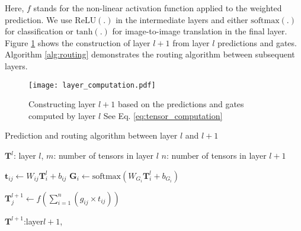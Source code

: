 \documentclass[10pt,twocolumn,letterpaper]{article}
\newlength\myindent
\newcommand\bindent{\begingroup
	\setlength{\itemindent}{\myindent}
	\addtolength{\algorithmicindent}{\myindent}
}
\newcommand\eindent{\endgroup}
\begin{document}
Here, $f$ stands for the non-linear activation function applied to the weighted prediction. We use $\mathrm{ReLU}(.)$ in the intermediate layers and either $\mathrm{softmax}(.)$ for classification or $\mathrm{tanh}(.)$ for image-to-image translation in the final layer. Figure \ref{fig:routing} shows the construction of layer $l+1$ from layer $l$ predictions and gates.
Algorithm \ref{alg:routing} demonstrates the routing algorithm between subsequent layers.



\begin{figure}[t]
	\begin{center}
		\texttt{[image: layer\_computation.pdf]}
	\end{center}
	\vspace{-0.2in}
	\caption{Constructing layer $l+1$ based on the predictions and gates computed by layer $l$ See Eq. \ref{eq:tensor_computation}}
	\label{fig:routing}
	\vspace{-0.1in}
\end{figure}

\begin{algorithm}[ht]
	\caption{Prediction and routing algorithm between layer $l$ and $l+1$}
	\label{alg:routing}
	\begin{algorithmic}
		\bindent
		\STATE $\boldsymbol{T}^{l}$: layer $l$, 
		\STATE $m$: number of tensors in layer $l$ 
		\STATE $n$: number of tensors in layer $l+1$  
		\eindent
		
		\bindent
		\STATE $\boldsymbol{t}_{ij} \leftarrow W_{ij}\boldsymbol{T}^{l}_{i} + b_{ij}$ 
		\ENDFOR
		\STATE $\boldsymbol{G}_i \leftarrow \mathrm{softmax}(W_{G_{i}}\boldsymbol{T}^{l}_{i} + b_{G_{i}})$ 
		\ENDFOR	
		\eindent	
		
		\bindent
		\STATE $\boldsymbol{T}^{l+1}_{j} \leftarrow  f(\sum_{i=1}^{n} (g_{ij}\times \boldsymbol{\mathit{t}}_{ij}))$
		\ENDFOR
		\eindent	
		
		\bindent
		\STATE $\boldsymbol{T}^{l+1}$:layer$l+1$,
		\eindent
	\end{algorithmic}	
\end{algorithm}
\end{document}
